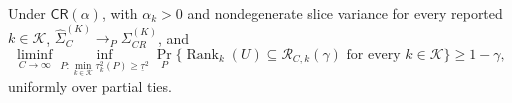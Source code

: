 Under \(\mathsf{CR}(\alpha)\), with \(\alpha_k>0\) and nondegenerate slice variance for every reported \(k\in\mathcal K\), \(\widehat\Sigma_C^{(K)}\to_P\Sigma_{CR}^{(K)}\), and \[\liminf_{C\to\infty}\inf_{P:\min_{k\in\mathcal K}\tau_k^2(P)\geq\underline\tau^2}\Pr_P\{\operatorname{Rank}_k(U)\subseteq\mathcal R_{C,k}(\gamma)\text{ for every }k\in\mathcal K\}\geq1-\gamma,\] uniformly over partial ties.